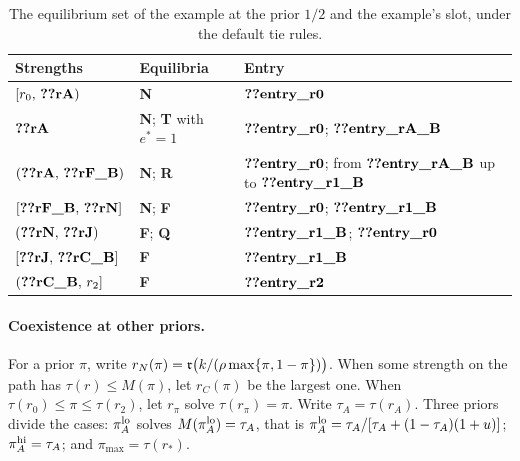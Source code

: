\begin{table}[ht]
\centering
\caption{The equilibrium set of the example at the prior \(1/2\) and the example's slot, under the default tie
rules.}\label{tab:a4-set}
\small
\begin{tabular}{@{}lll@{}}
\toprule
Strengths & Equilibria & Entry\\
\midrule
\([r_0,\,\reg{rA})\) & \textbf{N} & \(\reg{entry_r0}\)\\
\(\reg{rA}\) & \textbf{N}; \textbf{T} with \(e^*=1\) & \(\reg{entry_r0}\); \(\reg{entry_rA_B}\)\\
\((\reg{rA},\,\reg{rF_B})\) & \textbf{N}; \textbf{R} & \(\reg{entry_r0}\); from \(\reg{entry_rA_B}\) up to \(\reg{entry_r1_B}\)\\
\([\reg{rF_B},\,\reg{rN}]\) & \textbf{N}; \textbf{F} & \(\reg{entry_r0}\); \(\reg{entry_r1_B}\)\\
\((\reg{rN},\,\reg{rJ})\) & \textbf{F}; \textbf{Q} & \(\reg{entry_r1_B}\); \(\reg{entry_r0}\)\\
\([\reg{rJ},\,\reg{rC_B}]\) & \textbf{F} & \(\reg{entry_r1_B}\)\\
\((\reg{rC_B},\,r_2]\) & \textbf{F} & \(\reg{entry_r2}\)\\
\bottomrule
\end{tabular}
\end{table}

\paragraph{Coexistence at other priors.}
For a prior \(\pi\), write \(r_N(\pi)=\mathfrak{r}\bigl(k/(\rho\max\{\pi,1-\pi\})\bigr)\). When some strength on the path has
\(\tau(r)\le M(\pi)\), let \(r_C(\pi)\) be the largest one. When \(\tau(r_0)\le\pi\le\tau(r_2)\), let \(r_\pi\) solve
\(\tau(r_\pi)=\pi\). Write \(\tau_A=\tau(r_A)\). Three priors divide the cases: \(\pi_A^{\rm lo}\) solves
\(M(\pi_A^{\rm lo})=\tau_A\), that is \(\pi_A^{\rm lo}=\tau_A/[\tau_A+(1-\tau_A)(1+u)]\); \(\pi_A^{\rm hi}=\tau_A\); and
\(\pi_{\max}=\tau(r_*)\).

